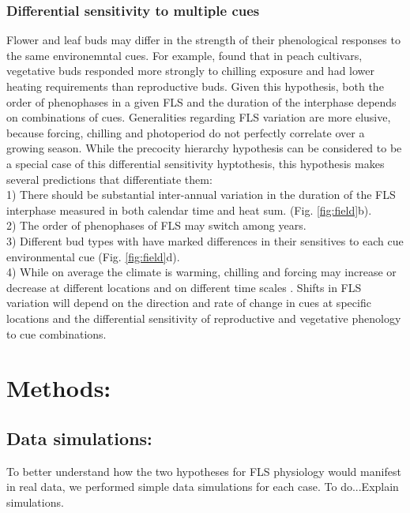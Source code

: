 \documentclass[11pt]{article}
\begin{document}
\subsubsection*{Differential sensitivity to multiple cues}
 \noindent Flower and leaf buds may differ in the strength of their phenological responses to the same environemntal cues. For example, \citet{Garigalio2016} found that in peach cultivars, vegetative buds responded more strongly to chilling exposure and had lower heating requirements than reproductive buds. Given this hypothesis, both the order of phenophases in a given FLS and the duration of the interphase depends on combinations of cues. Generalities regarding FLS variation are more elusive, because forcing, chilling and photoperiod do not perfectly correlate over a growing season. While the precocity hierarchy hypothesis can be considered to be a special case of this differential sensitivity hyptothesis, this hypothesis makes several predictions that differentiate them:\\

1) There should be substantial inter-annual variation in the duration of the FLS interphase measured in both calendar time and heat sum. (Fig. \ref{fig:field}b).\\ 2) The order of phenophases of FLS may switch among years.\\ 3) Different bud types with have marked differences in their sensitives to each cue environmental cue (Fig. \ref{fig:field}d).\\ 4) While on average the climate is warming, chilling and forcing may increase or decrease at different locations and on different time scales \citep{Ettinger2020}. Shifts in FLS variation will depend on the direction and rate of change in cues at specific locations and the differential sensitivity of reproductive and vegetative phenology to cue combinations.\\
\section{Methods:}
\subsection*{Data simulations:}
\noindent To better understand how the two hypotheses for FLS physiology would manifest in real data, we performed simple data simulations for each case.  To do...Explain simulations.
\end{document}

